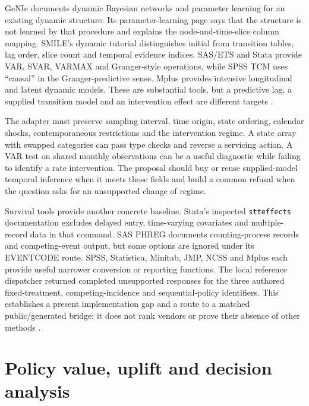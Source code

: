 GeNIe documents dynamic Bayesian networks and parameter learning for an existing
dynamic structure. Its parameter-learning page says that the structure is not
learned by that procedure and explains the node-and-time-slice column mapping.
SMILE's dynamic tutorial distinguishes initial from transition tables, lag order,
slice count and temporal evidence indices. SAS/ETS and Stata provide VAR,
SVAR, VARMAX and Granger-style operations, while SPSS TCM uses ``causal'' in
the Granger-predictive sense. Mplus provides intensive longitudinal and latent
dynamic models. These are substantial tools, but a predictive lag, a supplied
transition model and an intervention effect are different targets
\citep{exec13_ct_genie_dbn,exec13_ct_genie_learning,exec13_ct_smile_tutorial,
exec13_ct_stata_granger,exec13_ct_sas_causal,exec13_ct_ibm_tcm}.

The adapter must preserve sampling interval, time origin, state ordering,
calendar shocks, contemporaneous restrictions and the intervention regime. A
state array with swapped categories can pass type checks and reverse a
servicing action. A VAR test on shared monthly observations can be a useful
diagnostic while failing to identify a rate intervention. The proposal should
buy or reuse supplied-model temporal inference when it meets those fields and
build a common refusal when the question asks for an unsupported change of
regime.

Survival tools provide another concrete baseline. Stata's inspected
\texttt{stteffects} documentation excludes delayed entry, time-varying
covariates and multiple-record data in that command. SAS PHREG documents
counting-process records and competing-event output, but some options are
ignored under its EVENTCODE route. SPSS, Statistica, Minitab, JMP, NCSS and
Mplus each provide useful narrower conversion or reporting functions. The
local reference dispatcher returned completed unsupported responses for the
three authored fixed-treatment, competing-incidence and sequential-policy
identifiers. This establishes a present implementation gap and a route to a
matched public/generated bridge; it does not rank vendors or prove their
absence of other methods \citep{exec14_survival_stata,exec14_survival_sas,
exec14_survival_jmp,exec16_commercial_matrix,exec16_commercial_runtime}.

\section{Policy value, uplift and decision analysis}
\label{exec17:s8-policy}

